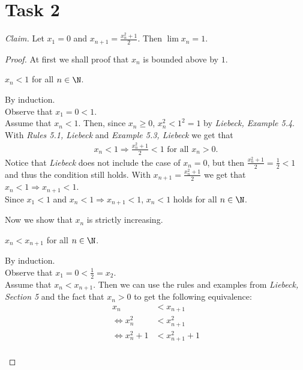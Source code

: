 \documentclass{article}
\begin{document}
\section*{Task 2}
\emph{Claim.} Let $x_1=0$ and $x_{n+1}=\frac{x_n^2+1}{2}$. Then $\lim x_n=1$.
\begin{proof}
  At first we shall proof that $x_n$ is bounded above by $1$.
  \begin{adjustwidth}{2em}{0pt}
    \begin{claim}
      $x_n<1$ for all $n\in\N$.
    \end{claim}
    \begin{claimproof}
      By induction.\\
      Observe that $x_1=0<1$.\\
      Assume that $x_n<1$. Then, since $x_n\geq 0$, $x_n^2<1^2=1$ by \emph{Liebeck, Example 5.4}. With \emph{Rules 5.1, Liebeck} and \emph{Example 5.3, Liebeck} we get that
      \begin{align*}
        x_n<1 \Rightarrow \frac{x_n^2+1}{2}<1 \text{ for all } x_n > 0.
      \end{align*}
      Notice that \emph{Liebeck} does not include the case of $x_n=0$, but then $\frac{x_n^2+1}{2}=\frac{1}{2}<1$ and thus the condition still holds.
      With $x_{n+1}=\frac{x^2_n+1}{2}$ we get that $x_n<1\Rightarrow x_{n+1}<1$.\\
      Since $x_1<1$ and $x_n<1 \Rightarrow x_{n+1}<1$, $x_n<1$ holds for all $n\in\N$.
    \end{claimproof}
  \end{adjustwidth}
  Now we show that $x_n$ is strictly increasing.
  \begin{adjustwidth}{2em}{0pt}
    \begin{claim}
      $x_n<x_{n+1}$ for all $n\in\N$.
    \end{claim}
    \begin{claimproof}
      By induction.\\
      Observe that $x_1=0<\frac{1}{2}=x_2$.\\
      Assume that $x_n<x_{n+1}$. Then we can use the rules and examples from \emph{Liebeck, Section 5} and the fact that $x_n>0$ to get the following equivalence:
      \begin{align*}
        x_n                               & <x_{n+1}                \\
        \Leftrightarrow x_n^2             & <x_{n+1}^2              \\
        \Leftrightarrow x_n^2+1           & <x_{n+1}^2+1            \\

\end{align*}
\end{claimproof}
\end{adjustwidth}
\end{proof}
\end{document}
